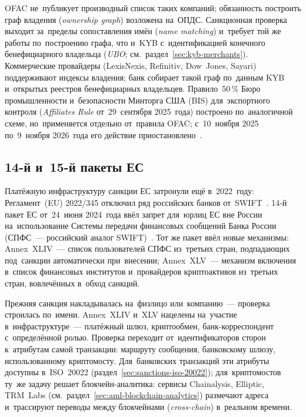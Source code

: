 OFAC не~публикует производный список таких компаний; обязанность построить граф
владения (\textit{ownership graph}) возложена на~ОПДС. Санкционная
проверка выходит за~пределы сопоставления имён (\textit{name matching})
и~требует той же работы по~построению графа, что и~KYB с~идентификацией
конечного бенефициарного владельца (\textit{UBO};
см.~раздел~\ref{sec:kyb-merchants}). Коммерческие провайдеры (LexisNexis,
Refinitiv, Dow~Jones, Sayari) поддерживают индексы владения; банк собирает
такой граф по~данным KYB и~открытых реестров бенефициарных владельцев.
Правило~50\,\% Бюро промышленности и~безопасности Минторга США (BIS)
для~экспортного контроля (\textit{Affiliates Rule} от~29~сентября 2025~года)
построено по~аналогичной схеме, но~применяется отдельно от~правила OFAC;
с~10~ноября 2025 по~9~ноября 2026~года его действие
приостановлено~\cite{us-bis-affiliates-rule-suspension-2025}.

\subsection*{14-й и~15-й пакеты ЕС}

Платёжную инфраструктуру санкции ЕС затронули ещё в~2022~году: Регламент~(EU)
2022/345 отключил ряд российских банков от~SWIFT~\cite{eu-swift-russia-2022}.
14-й пакет ЕС
от~24~июня 2024~года ввёл
запрет для~юрлиц ЕС вне России на~использование Системы передачи финансовых
сообщений Банка России (СПФС~--- российский аналог
SWIFT)~\cite{eu-14th-sanctions-2024}. Тот же пакет ввёл новые механизмы:
Annex~XLIV~--- список пользователей СПФС из~третьих стран, подпадающих
под~санкции автоматически при~внесении; Annex~XLV~--- механизм включения
в~список финансовых институтов и~провайдеров криптоактивов из~третьих стран,
вовлечённых в~обход санкций.

Прежняя санкция накладывалась на~физлицо или~компанию~--- проверка строилась
по~имени. Annex~XLIV и~XLV нацелены на~участие в~инфраструктуре~--- платёжный
шлюз, криптообмен, банк-корреспондент с~определённой ролью. Проверка переходит
от~идентификаторов сторон к~атрибутам самой транзакции: маршруту сообщения,
банковскому шлюзу, использованному криптомосту. Для~банковских
транзакций эти атрибуты доступны в~ISO~20022
(раздел~\ref{sec:sanctions-iso-20022}); для~криптомостов ту~же задачу решает
блокчейн-аналитика: сервисы Chainalysis, Elliptic, TRM~Labs
(см.~раздел~\ref{sec:aml-blockchain-analytics})
размечают адреса и~трассируют переводы между блокчейнами (\textit{cross-chain})
в~реальном времени.

